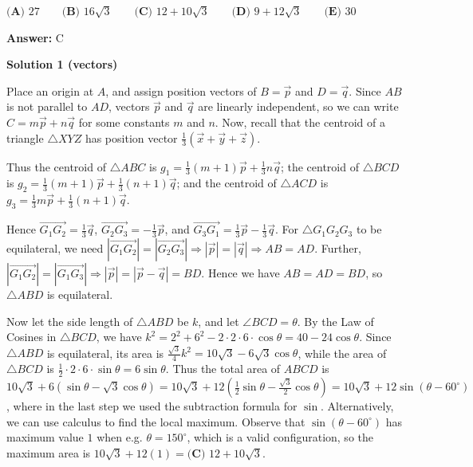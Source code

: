 \begin{enumerate}
 $\textbf{(A) } 27 \qquad\textbf{(B) } 16\sqrt3 \qquad\textbf{(C) } 12+10\sqrt3 \qquad\textbf{(D) } 9+12\sqrt3 \qquad\textbf{(E) } 30$

 \textbf{Answer: }C



\textbf{Solution 1 (vectors)}

Place an origin at $A$, and assign position vectors of $B = \vec{p}$ and $D = \vec{q}$. Since $AB$ is not parallel to $AD$, vectors $\vec{p}$ and $\vec{q}$ are linearly independent, so we can write $C = m\vec{p} + n\vec{q}$ for some constants $m$ and $n$. Now, recall that the centroid of a triangle $\triangle XYZ$ has position vector $\frac{1}{3}\left(\vec{x}+\vec{y}+\vec{z}\right)$. 

 Thus the centroid of $\triangle ABC$ is $g_1 = \frac{1}{3}(m+1)\vec{p} + \frac{1}{3}n\vec{q}$; the centroid of $\triangle BCD$ is $g_2 = \frac{1}{3}(m+1)\vec{p} + \frac{1}{3}(n+1)\vec{q}$; and the centroid of $\triangle ACD$ is $g_3 = \frac{1}{3}m\vec{p} + \frac{1}{3}(n+1)\vec{q}$. 

 Hence $\overrightarrow{G_{1}G_{2}} = \frac{1}{3}\vec{q}$, $\overrightarrow{G_{2}G_{3}} = -\frac{1}{3}\vec{p}$, and $\overrightarrow{G_{3}G_{1}} = \frac{1}{3}\vec{p} - \frac{1}{3}\vec{q}$. For $\triangle G_{1}G_{2}G_{3}$ to be equilateral, we need $\left|\overrightarrow{G_{1}G_{2}}\right| = \left|\overrightarrow{G_{2}G_{3}}\right| \Rightarrow \left|\vec{p}\right| = \left|\vec{q}\right| \Rightarrow AB = AD$. Further, $\left|\overrightarrow{G_{1}G_{2}}\right| = \left|\overrightarrow{G_{1}G_{3}}\right| \Rightarrow \left|\vec{p}\right| = \left|\vec{p} - \vec{q}\right| = BD$. Hence we have $AB = AD = BD$, so $\triangle ABD$ is equilateral.

 Now let the side length of $\triangle ABD$ be $k$, and let $\angle BCD = \theta$. By the Law of Cosines in $\triangle BCD$, we have $k^2 = 2^2 + 6^2 - 2 \cdot 2 \cdot 6 \cdot \cos{\theta} = 40 - 24\cos{\theta}$. Since $\triangle ABD$ is equilateral, its area is $\frac{\sqrt{3}}{4}k^2 = 10\sqrt{3} - 6\sqrt{3}\cos{\theta}$, while the area of $\triangle BCD$ is $\frac{1}{2} \cdot 2 \cdot 6 \cdot \sin{\theta} = 6 \sin{\theta}$. Thus the total area of $ABCD$ is $10\sqrt{3} + 6\left(\sin{\theta} - \sqrt{3}\cos{\theta}\right) = 10\sqrt{3} + 12\left(\frac{1}{2} \sin{\theta} - \frac{\sqrt{3}}{2}\cos{\theta}\right) = 10\sqrt{3}+12\sin{\left(\theta-60^{\circ}\right)}$, where in the last step we used the subtraction formula for $\sin$. Alternatively, we can use calculus to find the local maximum. Observe that $\sin{\left(\theta-60^{\circ}\right)}$ has maximum value $1$ when e.g. $\theta = 150^{\circ}$, which is a valid configuration, so the maximum area is $10\sqrt{3} + 12(1) = \boxed{\textbf{(C) } 12+10\sqrt3}$.


\end{enumerate}
